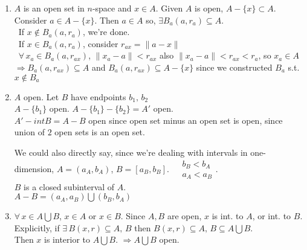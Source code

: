 \documentclass[twoside]{amsart}
\theoremstyle{plain}
\theoremstyle{definition}
\newcommand{\exercisehead}[1]
  {
   \noindent{\small\bf Exercise #1.}
   \smallskip}
\begin{document}
\exercisehead{4} 
\begin{enumerate}
\item $A$ is an open set in $n$-space and $x \in A$.  Given $A$ is open, $A - \{ x\} \subset A$.  \medskip \\
Consider $a \in A - \{ x \}$.  Then $a \in A$ so, $\exists B_a(a,r_a) \subseteq A$.  \\
\quad \quad \, If $x \notin B_a(a,r_a)$, we're done.  \\
\quad \quad \, If $x \in B_a(a,r_a)$, consider $r_{ax} = \| a- x \|$ \\
\quad \quad \quad \, $\forall \, x_a \in B_a(a,r_{ax})$, $\| x_a - a \| < r_{ax}$ also $\| x_a - a \| < r_{ax} < r_a$, so $x_a \in A$ \\
$\Longrightarrow B_a(a,r_{ax}) \subseteq A$ and $B_a(a,r_{ax}) \subseteq A - \{ x \}$ since we constructed $B_a$ s.t. $x \notin B_a$
\item $A$ open.  Let $B$ have endpoints $b_1,\, b_2$ \medskip \\
  $A-\{ b_1 \}$ open.  $A - \{ b_1 \} - \{ b_2 \} = A'$ open.  \\
  $A' - int{B} = A-B$ open since open set minus an open set is open, since union of $2$ open sets is an open set.  

We could also directly say, since we're dealing with intervals in one-dimension, $A=(a_A, b_A)$, $B = [a_B, b_B]$.  $\begin{aligned}
  & b_B < b_A \\
  & a_A < a_B
\end{aligned}$.  \smallskip \\
$B$ is a closed subinterval of $A$.  \\
$A-B = (a_A,a_B) \bigcup (b_B,b_A)$
\item $\forall \, x \in A \bigcup B$, $x \in A$ or $x \in B$.  Since $A,B$ are open, $x$ is int. to $A$, or int. to $B$. \\
Explicitly, if $\exists \, B(x,r) \subseteq A, \, B$ then $B(x,r) \subseteq A, \, B \subseteq A \bigcup B$.  \\
Then $x$ is interior to $A\bigcup B$.  $\Longrightarrow A \bigcup B$ open.  


\end{enumerate}
\end{document}
